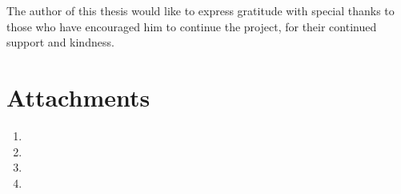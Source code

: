 \documentclass[12pt]{report}
\begin{document}
The author of this thesis would like to express gratitude with special thanks to those who have encouraged him to continue the project, for their continued support and kindness. 
\printbibliography[heading=bibintoc]

\listoffigures

\listoftables 

\chapter*{Attachments}
\begin{enumerate}  
	\item 
	\item 
	\item 
	\item
\end{enumerate} 
\end{document}
